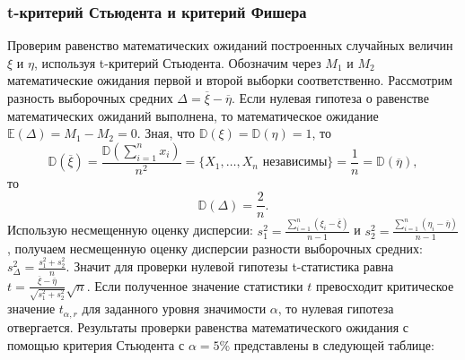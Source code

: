 \documentclass[11pt]{article}
\begin{document}
\subsubsection{t-критерий Стьюдента и критерий Фишера}
Проверим равенство математических ожиданий построенных случайных величин $\xi$ и $\eta$, используя t-критерий Стьюдента. Обозначим через $M_1$ и $M_2$ математические ожидания первой и второй выборки соответственно. Рассмотрим разность выборочных средних $\Delta = \overline{\xi} - \overline{\eta}.$
Если нулевая гипотеза о равенстве математических ожиданий выполнена, то математическое ожидание $\mathbb{E}(\Delta) = M_1 - M_2 = 0.$ Зная, что $\mathbb{D}(\xi) = \mathbb{D}(\eta) = 1$, то
\[ \mathbb{D}(\overline{\xi}) = \frac{\mathbb{D}(\sum_{i = 1}^{n}x_i)}{n^2} = \{X_1,\dots, X_n \text{ независимы} \} = \frac{1}{n} = \mathbb{D}(\overline{\eta}), \]
то
\[\mathbb{D}(\Delta) = \frac{2}{n}.\] 
Использую несмещенную оценку дисперсии: $s_1^2 = \frac{\sum_{i = 1}^{n}(\xi_i - \overline{\xi})}{n - 1}$ и $s_2^2 = \frac{\sum_{i = 1}^{n}(\eta_i - \overline{\eta})}{n - 1}$, получаем несмещенную оценку дисперсии разности выборочных средних: $s_\Delta^2 = \frac{s_1^2 + s_2^2}{n}.$ 
\newline 
Значит для проверки нулевой гипотезы t-статистика равна $t = \frac{\overline{\xi} - \overline{\eta}}{\sqrt{s_1^2 + s_2^2}}\sqrt{n}.$
\newline
Если полученное значение статистики $t$ превосходит критическое значение $t_{\alpha,r}$ для заданного уровня значимости $\alpha$, то нулевая гипотеза отвергается.
\newline
Результаты проверки равенства математического ожидания с помощью критерия Стьюдента с $\alpha = 5$\% представлены в следующей таблице:
\end{document}
